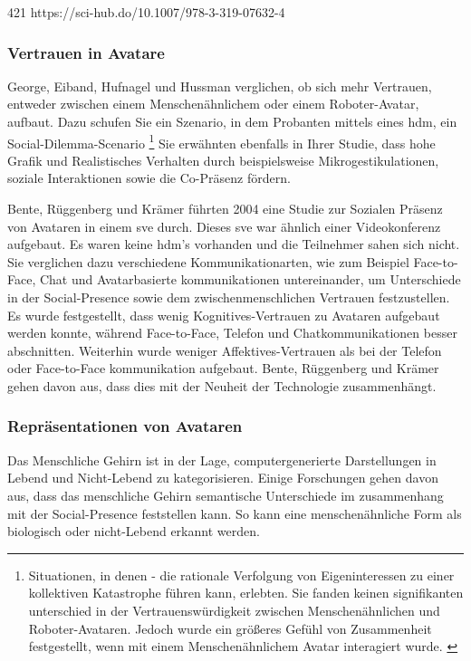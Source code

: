 \documentclass[a4paper,11pt]{article}%
\renewcommand{\\}{\vspace*{0.5\baselineskip} \newline}
\begin{document}
421
https://sci-hub.do/10.1007/978-3-319-07632-4 


\subsubsection{Vertrauen in Avatare}
			
George, Eiband, Hufnagel und Hussman verglichen, ob sich mehr Vertrauen, entweder zwischen einem Menschenähnlichem oder einem Roboter-Avatar, aufbaut. Dazu schufen Sie ein Szenario, in dem Probanten mittels eines \ac{hdm}, ein Social-Dilemma-Scenario  \footnote{Situationen, in denen - die rationale Verfolgung von Eigeninteressen zu einer kollektiven Katastrophe führen kann, erlebten. Sie fanden keinen signifikanten unterschied in der Vertrauenswürdigkeit zwischen Menschenähnlichen und Roboter-Avataren. Jedoch wurde ein größeres Gefühl von Zusammenheit festgestellt, wenn mit einem Menschenähnlichem Avatar interagiert wurde. \citep{kerr1983motivation}}
Sie erwähnten ebenfalls in Ihrer Studie, dass hohe Grafik und Realistisches Verhalten durch beispielsweise Mikrogestikulationen, soziale Interaktionen sowie die Co-Präsenz fördern. \citep{george2018trusting}

Bente, Rüggenberg und Krämer führten 2004 eine Studie zur Sozialen Präsenz von Avataren in einem \ac{sve} durch. Dieses \ac{sve} war ähnlich einer Videokonferenz aufgebaut. Es waren keine \ac{hdm}'s vorhanden und die Teilnehmer sahen sich nicht. Sie verglichen dazu verschiedene Kommunikationarten, wie zum Beispiel Face-to-Face, Chat und Avatarbasierte kommunikationen untereinander, um Unterschiede in der Social-Presence sowie dem zwischenmenschlichen Vertrauen festzustellen.
Es wurde festgestellt, dass wenig Kognitives-Vertrauen zu Avataren aufgebaut werden konnte, während Face-to-Face, Telefon und Chatkommunikationen besser abschnitten. Weiterhin wurde weniger Affektives-Vertrauen als bei der Telefon oder Face-to-Face kommunikation aufgebaut.
Bente, Rüggenberg und Krämer gehen davon aus, dass dies mit der Neuheit der Technologie zusammenhängt. \citep[p.54-59]{bente2004social}
			
\subsubsection{Repräsentationen von Avataren}

Das Menschliche Gehirn ist in der Lage, computergenerierte Darstellungen in \flqq Lebend und Nicht-Lebend \frqq zu kategorisieren. Einige Forschungen gehen davon aus, dass das menschliche Gehirn semantische Unterschiede im zusammenhang mit der Social-Presence feststellen kann. So kann eine menschenähnliche Form als biologisch oder nicht-Lebend erkannt werden. 
\end{document}
